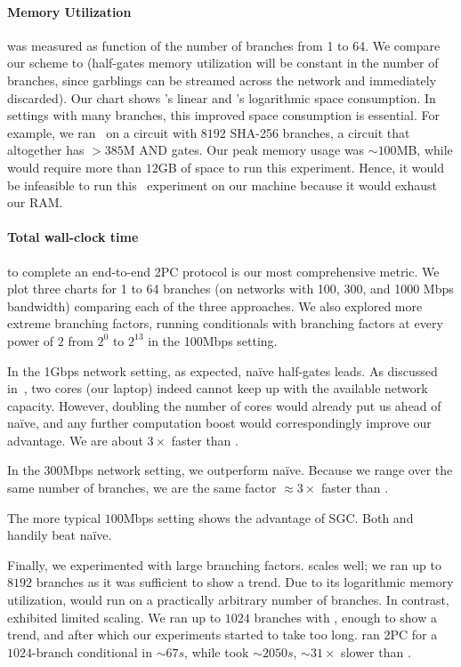 \paragraph{Memory Utilization} was measured as function of the number
of branches from 1 to 64.
We compare our scheme to \stack (half-gates memory utilization will be
constant in the number of branches, since garblings
can be streamed across the network and immediately discarded).
%
Our chart shows \stack's linear and
\ourschemelong's logarithmic space consumption.
In settings with many branches, this improved space consumption
is essential.
For example, we ran \ourschemelong\ on a circuit
with $8192$ SHA-256 branches, a circuit that altogether has $> 385$M
AND gates.  Our peak memory usage was $\sim 100$MB, while \HK
would require more than $12$GB of space to run this experiment.
Hence, it would be
infeasible to run this \stack\ experiment on our machine because it
would exhaust our RAM.

\paragraph{Total wall-clock time} to complete an end-to-end 2PC
protocol is our most comprehensive metric.
We plot three charts for 1 to 64
branches (on networks with 100, 300, and 1000 Mbps bandwidth) comparing each of the three approaches.
We also explored more extreme branching factors, running conditionals with
branching factors at every power of $2$ from $2^0$ to $2^{13}$ in the 100Mbps setting.

In the 1Gbps network setting, as expected, na\"ive half-gates leads.
As discussed in~, two cores (our laptop) indeed
cannot keep up with the available network capacity.  However, doubling
the number of cores would already put us ahead of na\"ive, and any
further computation boost would correspondingly improve
our advantage.  We are about $3\times$ faster than \stack.

In the 300Mbps network setting, we outperform na\"ive.  Because we
range over the same number of branches, we are the same
factor $\approx 3\times$ faster than \stack.

The more typical $100$Mbps setting shows the advantage of SGC.
Both \stack and \ourschemelong handily beat na\"ive.

Finally, we experimented with large branching factors.
\ourschemelong scales well; we ran up to $8192$ branches as it
was sufficient to show a trend.  Due to its logarithmic memory
utilization, \ourschemelong would run on a practically
arbitrary number of branches.  In contrast, \stack exhibited limited
scaling.  We ran up to $1024$ branches with
\stack, enough to show a trend, and after which our experiments
started to take too long.   \ourschemelong ran 2PC for a
$1024$-branch conditional in $\sim 67s$, while \stack took $\sim
2050s$,  $\sim 31\times$ slower than \ourschemelong.


